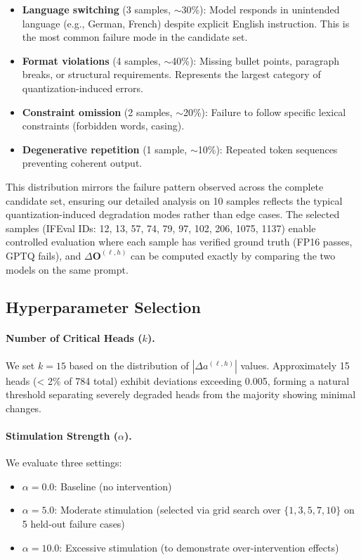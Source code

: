 \begin{itemize}
    \item \textbf{Language switching} (3 samples, $\sim$30\%): Model 
          responds in unintended language (e.g., German, French) despite 
          explicit English instruction. This is the most common failure 
          mode in the candidate set.
    \item \textbf{Format violations} (4 samples, $\sim$40\%): Missing 
          bullet points, paragraph breaks, or structural requirements. 
          Represents the largest category of quantization-induced errors.
    \item \textbf{Constraint omission} (2 samples, $\sim$20\%): Failure 
          to follow specific lexical constraints (forbidden words, casing).
    \item \textbf{Degenerative repetition} (1 sample, $\sim$10\%): 
          Repeated token sequences preventing coherent output.
\end{itemize}

This distribution mirrors the failure pattern observed across the complete 
candidate set, ensuring our detailed analysis on 10 samples reflects the 
typical quantization-induced degradation modes rather than edge cases. The 
selected samples (IFEval IDs: 12, 13, 57, 74, 79, 97, 102, 206, 1075, 1137) 
enable controlled evaluation where each sample has verified ground truth 
(FP16 passes, GPTQ fails), and $\Delta\mathbf{O}^{(\ell,h)}$ can be 
computed exactly by comparing the two models on the same prompt.

\subsection{Hyperparameter Selection}
\label{app:hyperparameters}

\paragraph{Number of Critical Heads ($k$).}
We set $k=15$ based on the distribution of $|\Delta a^{(\ell,h)}|$ values. 
Approximately 15 heads (< 2\% of 784 total) exhibit deviations exceeding 
0.005, forming a natural threshold separating severely degraded heads from 
the majority showing minimal changes.

\paragraph{Stimulation Strength ($\alpha$).}
We evaluate three settings:
\begin{itemize}
    \item $\alpha = 0.0$: Baseline (no intervention)
    \item $\alpha = 5.0$: Moderate stimulation (selected via grid search over 
          $\{1, 3, 5, 7, 10\}$ on 5 held-out failure cases)
    \item $\alpha = 10.0$: Excessive stimulation (to demonstrate over-intervention 
          effects)
\end{itemize}

